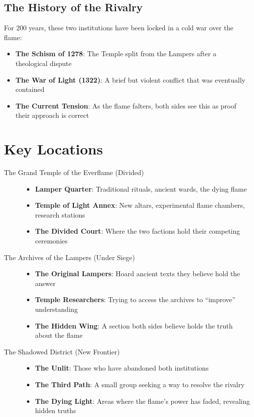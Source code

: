 \documentclass[12pt]{article}
\begin{document}
\subsection{The History of the Rivalry}
For 200 years, these two institutions have been locked in a cold war over the flame:
\begin{itemize}
    \item \textbf{The Schism of 1278}: The Temple split from the Lampers after a theological dispute
    \item \textbf{The War of Light (1322)}: A brief but violent conflict that was eventually contained
    \item \textbf{The Current Tension}: As the flame falters, both sides see this as proof their approach is correct
\end{itemize}

\section{Key Locations}

\begin{description}
    \item[The Grand Temple of the Everflame (Divided)]
    \begin{itemize}
        \item \textbf{Lamper Quarter}: Traditional rituals, ancient wards, the dying flame
        \item \textbf{Temple of Light Annex}: New altars, experimental flame chambers, research stations
        \item \textbf{The Divided Court}: Where the two factions hold their competing ceremonies
    \end{itemize}
    
    \item[The Archives of the Lampers (Under Siege)]
    \begin{itemize}
        \item \textbf{The Original Lampers}: Hoard ancient texts they believe hold the answer
        \item \textbf{Temple Researchers}: Trying to access the archives to ``improve'' understanding
        \item \textbf{The Hidden Wing}: A section both sides believe holds the truth about the flame
    \end{itemize}
    
    \item[The Shadowed District (New Frontier)]
    \begin{itemize}
        \item \textbf{The Unlit}: Those who have abandoned both institutions
        \item \textbf{The Third Path}: A small group seeking a way to resolve the rivalry
        \item \textbf{The Dying Light}: Areas where the flame's power has faded, revealing hidden truths
    \end{itemize}
\end{description}
\end{document}
